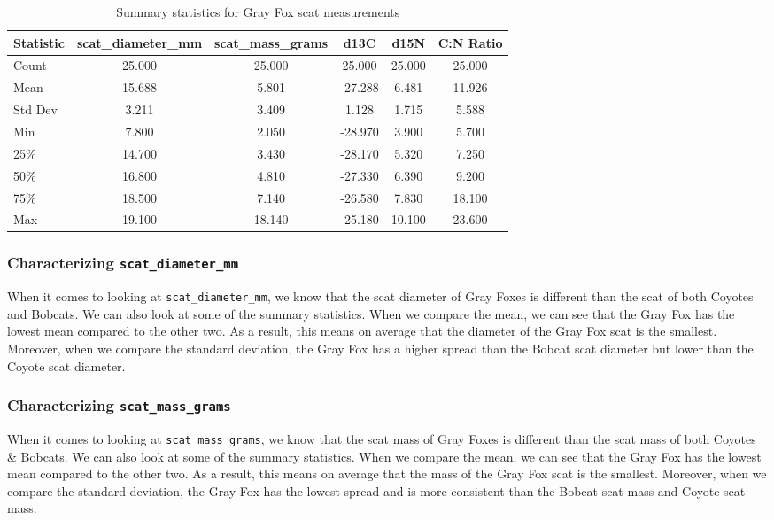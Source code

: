 \documentclass[a4paper]{article}
\begin{document}
\vspace{0.5cm}

\begin{table}[h]
    \centering
    \begin{tabular}{|l|c|c|c|c|c|}
    \hline
    \textbf{Statistic} & \textbf{scat\_diameter\_mm} & \textbf{scat\_mass\_grams} & \textbf{d13C} & \textbf{d15N} & \textbf{C:N Ratio} \\
    \hline
    Count & 25.000 & 25.000 & 25.000 & 25.000 & 25.000 \\
    Mean & 15.688 & 5.801 & -27.288 & 6.481 & 11.926 \\
    Std Dev & 3.211 & 3.409 & 1.128 & 1.715 & 5.588 \\
    Min & 7.800 & 2.050 & -28.970 & 3.900 & 5.700 \\
    25\% & 14.700 & 3.430 & -28.170 & 5.320 & 7.250 \\
    50\% & 16.800 & 4.810 & -27.330 & 6.390 & 9.200 \\
    75\% & 18.500 & 7.140 & -26.580 & 7.830 & 18.100 \\
    Max & 19.100 & 18.140 & -25.180 & 10.100 & 23.600 \\
    \hline
    \end{tabular}
    \caption{Summary statistics for Gray Fox scat measurements}
    \label{tab:gray_fox_summary_stats}
\end{table}

\subsubsection{Characterizing \texttt{scat\_diameter\_mm}}
When it comes to looking at \texttt{scat\_diameter\_mm}, we know that the scat diameter of Gray Foxes is different than the scat of both Coyotes and Bobcats.
We can also look at some of the summary statistics. When we compare the mean, we can see that the Gray Fox has the lowest mean compared to the other two.
As a result, this means on average that the diameter of the Gray Fox scat is the smallest. Moreover, when we compare the standard deviation, the Gray Fox has 
a higher spread than the Bobcat scat diameter but lower than the Coyote scat diameter.

\subsubsection{Characterizing \texttt{scat\_mass\_grams}}
When it comes to looking at \texttt{scat\_mass\_grams}, we know that the scat mass of Gray Foxes is different than the scat mass of both Coyotes \& Bobcats.
We can also look at some of the summary statistics. When we compare the mean, we can see that the Gray Fox has the lowest mean compared to the other two.
As a result, this means on average that the mass of the Gray Fox scat is the smallest. Moreover, when we compare the standard deviation, the Gray Fox has
the lowest spread and is more consistent than the Bobcat scat mass and Coyote scat mass.
\end{document}
